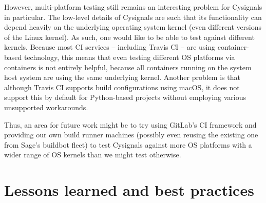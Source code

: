 \documentclass{deliverablereport}
\begin{document}
However, multi-platform testing still remains an interesting problem for
Cysignals in particular.  The low-level details of Cysignals are such that its
functionality can depend heavily on the underlying operating system kernel
(even different versions of the Linux kernel).  As such, one would like to be
able to test against different kernels.  Because most CI services -- including
Travis CI -- are using container-based technology, this means that even testing
different OS platforms via containers is not entirely helpful, because all
containers running on the system host system are using the same underlying
kernel. Another problem is that although Travis CI supports build
configurations using macOS, it does not support this by default for
Python-based projects without employing various unsupported workarounds.

Thus, an area for future work might be to try using GitLab's CI framework and
providing our own build runner machines (possibly even reusing the existing one
from Sage's buildbot fleet) to test Cysignals against more OS platforms with a
wider range of OS kernels than we might test otherwise.

\hypertarget{best-practices}{%
\section{Lessons learned and best practices}\label{best-practices}}
\end{document}
